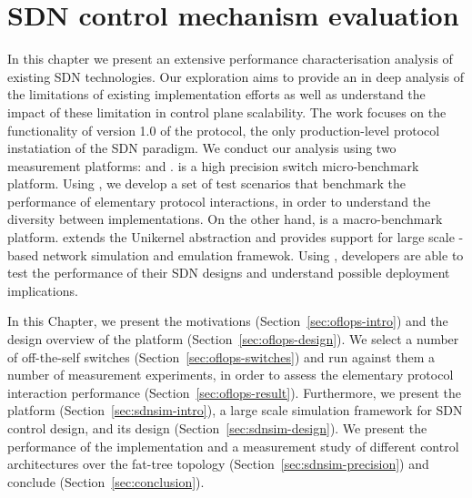 \chapter{SDN control mechanism evaluation}
\ifpdf
    \graphicspath{{Chapter1/Chapter1Figs/PNG/}{Chapter1/Chapter1Figs/PDF/}{Chapter1/Chapter1Figs/}}
\else
    \graphicspath{{Chapter1/Chapter1Figs/EPS/}{Chapter1/Chapter1Figs/}}
\fi

In this chapter we present an extensive performance characterisation analysis of
existing SDN technologies. Our exploration aims to provide an in deep analysis
of the limitations of existing implementation efforts as well as understand the
impact of these limitation in control plane scalability.  The work focuses on
the functionality of version 1.0 of the \of protocol, the only production-level
protocol instatiation of the SDN paradigm. 
We conduct our analysis using two measurement platforms: \oflops and \sdnsim.
\oflops is a high precision \of switch micro-benchmark platform. Using \oflops,
we develop a set of test scenarios that benchmark the performance of elementary
\of protocol interactions, in order to understand the diversity between
implementations. On the other hand, \sdnsim is a macro-benchmark \of platform.
\sdnsim extends the Unikernel abstraction and provides support for large scale
\of-based network simulation and emulation framewok. Using \sdnsim, developers
are able to test the performance of their SDN designs and understand possible
deployment implications.


In this Chapter, we present the motivations (Section~\ref{sec:oflops-intro}) and
the design overview of the \oflops platform (Section~\ref{sec:oflops-design}).
We select a number of off-the-self \of switches
(Section~\ref{sec:oflops-switches}) and run against them a number of measurement
experiments, in order to assess the elementary protocol interaction performance
(Section~\ref{sec:oflops-result}). Furthermore, we present the
\sdnsim platform (Section~\ref{sec:sdnsim-intro}), a large scale simulation
framework for SDN control design, and its design
(Section~\ref{sec:sdnsim-design}). We present the performance of the \sdnsim
implementation and a measurement study of different control architectures over
the fat-tree topology (Section~\ref{sec:sdnsim-precision}) and conclude
(Section~\ref{sec:conclusion}). 

